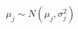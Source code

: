 \documentclass[preview]{standalone}
\begin{document}
\begin{align*}
\mu_j \sim N(\mu_j,\sigma_j^2)
\end{align*}
\end{document}
